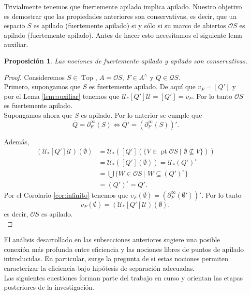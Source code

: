\documentclass[11pt]{amsart}
\DeclareMathOperator{\pt}{pt}
\DeclareMathOperator{\Top}{Top}
\theoremstyle{plain}
\newtheorem{prop}[thm]{Proposición}
\theoremstyle{definition}
\begin{document}
Trivialmente tenemos que fuertemente apilado implica apilado. Nuestro objetivo es demostrar que las propiedades anteriores son conservativas, es decir, que un espacio $S$ es apilado (fuertemente apilado) si y sólo si su marco de abiertos $\mathcal{O}S$ es apilado (fuertemente apilado). 
Antes de hacer esto necesitamos el siguiente lema auxiliar.

\begin{prop}\label{apiladoconservativa}
Las nociones de fuertemente apilado y apilado son conservativas.
\end{prop}

\begin{proof}
Consideremos $S\in \Top$, $A=\mathcal{O}S$, $F\in A^\wedge$ y $Q\in \mathcal{Q}S$.\\

Primero, supongamos que $S$ es fuertemente apilado. De aquí que $v_F=[Q']$ y por el Lema \ref{lem:auxiliar} tenemos que $\mathcal{U}_*[Q']\mathcal{U}=[Q']=v_F$. Por lo tanto $\mathcal{O}S$ es fuertemente apilado.\\

Supongamos ahora que $S$ es apilado. Por lo anterior se cumple que 
\[
\overline{Q}=\partial_F^\infty(S)\iff \overline{Q}'=(\partial_F^{\infty}(S))'.
\]

Además, 
\[
\begin{split}
(\mathcal{U}_*[Q']\mathcal{U})(\emptyset)&=\mathcal{U}_*([Q'](\{V\in \pt\mathcal{O}S\mid \emptyset \not\subseteq V\}))\\
&=\mathcal{U}_*([Q'](\emptyset))=\mathcal{U}_*(Q')^{\circ}\\
&=\bigcup\{W\in \mathcal{O}S\mid W\subseteq (Q')^\circ\}\\
&=(Q')^{\circ}=\overline{Q}'.
\end{split}
\]
Por el Corolario \ref{cor:infinito} tenemos que $v_F(\emptyset)=(\partial_F^\infty(\emptyset'))'$. Por lo tanto 
\[
v_F(\emptyset)=(\mathcal{U}_*[Q']\mathcal{U})(\emptyset),
\]
es decir, $\mathcal{O}S$ es apilado.\\
\end{proof}

El análisis desarrollado en las subsecciones anteriores sugiere una posible conexión más profunda entre eficiencia y las nociones 
libres de puntos de apilado introducidas. En particular, surge la pregunta de si estas nociones permiten caracterizar la eficiencia
bajo hipótesis de separación adecuadas.\\

Las siguientes cuestiones forman parte del trabajo en curso y orientan las etapas posteriores de la investigación.\\
\end{document}
